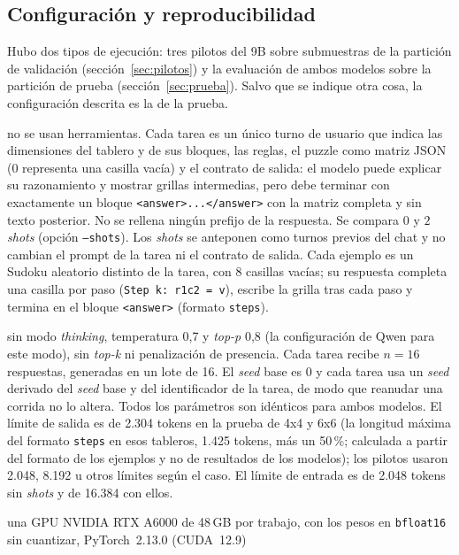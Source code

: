\subsection{Configuración y reproducibilidad}
Hubo dos tipos de ejecución: tres pilotos del 9B sobre submuestras de la
partición de validación (sección~\ref{sec:pilotos}) y la evaluación de ambos
modelos sobre la partición de prueba (sección~\ref{sec:prueba}). Salvo que se
indique otra cosa, la configuración descrita es la de la prueba.
\begin{description}[leftmargin=0pt]
  \item[Prompt y herramientas:] no se usan herramientas. Cada tarea es un único
  turno de usuario que indica las dimensiones del tablero y de sus bloques, las
  reglas, el puzzle como matriz JSON (0 representa una casilla vacía) y el
  contrato de salida: el modelo puede explicar su razonamiento y mostrar grillas
  intermedias, pero debe terminar con exactamente un bloque
  \texttt{<answer>...</answer>} con la matriz completa y sin texto posterior. No
  se rellena ningún prefijo de la respuesta. Se compara $0$ y $2$
  \emph{shots} (opción \texttt{--shots}). Los \emph{shots} se anteponen como
  turnos previos del chat y no cambian el prompt de la tarea ni el contrato de
  salida. Cada ejemplo es un Sudoku aleatorio distinto de la tarea, con 8
  casillas vacías; su respuesta completa una casilla por paso
  (\texttt{Step k: r1c2 = v}), escribe la grilla tras cada paso y termina en el
  bloque \texttt{<answer>} (formato \texttt{steps}).
  \item[Inferencia:] sin modo \emph{thinking}, temperatura 0{,}7 y \emph{top-p}
  0{,}8 (la configuración de Qwen para este modo), sin \emph{top-k} ni
  penalización de presencia. Cada tarea recibe $n = 16$ respuestas, generadas
  en un lote de 16. El \emph{seed} base es 0 y cada tarea usa un \emph{seed}
  derivado del \emph{seed} base y del identificador de la tarea, de modo que
  reanudar una corrida no lo altera. Todos los parámetros son idénticos para
  ambos modelos. El límite de salida es de 2.304 tokens en la prueba de 4x4 y
  6x6 (la longitud máxima del formato \texttt{steps} en esos tableros, 1.425
  tokens, más un 50\,\%; calculada a
  partir del formato de los ejemplos y no de resultados de los modelos); los
  pilotos usaron 2.048, 8.192 u otros límites según el caso. El límite de
  entrada es de 2.048 tokens sin \emph{shots} y de 16.384 con ellos.
  \item[Entorno de ejecución:] una GPU NVIDIA RTX A6000 de 48\,GB por trabajo,
  con los pesos en \texttt{bfloat16} sin cuantizar, PyTorch~2.13.0 (CUDA~12.9)

\end{description}
